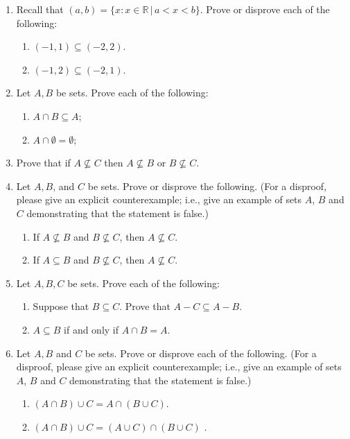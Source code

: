 \documentclass[12pt]{article}
\begin{document}
\begin{enumerate}
\item Recall that $(a,b) = \{x : x \in \mathbb{R} \,|\, a < x < b\}$. Prove or disprove each of the following:
 \begin{enumerate}
 \item $(-1,1) \subseteq (-2,2)$. 
 \item $(-1,2) \subseteq (-2,1)$.
 \end{enumerate}



 \item Let $A,B$ be sets. Prove each of the following:
 \begin{enumerate}
 \item $A \cap B \subseteq A$;
 \item $A \cap \emptyset = \emptyset$;
 \end{enumerate}

\item Prove that if $A \not \subseteq C$ then  $A \not \subseteq B$ or $B \not \subseteq C$.
 
 \item Let $A,B$, and $C$ be sets. Prove or disprove the following. (For a disproof, please give an explicit counterexample; i.e., give an example of sets $A$, $B$ and $C$ demonstrating that the statement is false.)
 \begin{enumerate}
 \item If $A \not \subseteq B$ and $B \not \subseteq C$, then $A \not \subseteq C$.
 \item If $A \subseteq B$ and $B \not \subseteq C$, then $A \not \subseteq C$.
 \end{enumerate}
 
 \item Let $A,B,C$ be sets. Prove each of the following:
 \begin{enumerate}
 \item Suppose that $B \subseteq C$. Prove that $A-C \subseteq A-B$.
 \item $A \subseteq B$ if and only if $A \cap B = A$.
 \end{enumerate}
 
  \item Let $A,B$ and $C$ be sets. Prove or disprove each of the following. (For a disproof, please give an explicit counterexample; i.e., give an example of sets $A$, $B$ and $C$ demonstrating that the statement is false.)
 \begin{enumerate}
\item $(A \cap B ) \cup C = A \cap (B  \cup C)$.
\item $(A \cap B ) \cup C = (A \cup C) \cap (B  \cup C)$  .
 \end{enumerate}


\end{enumerate}
\end{document}
